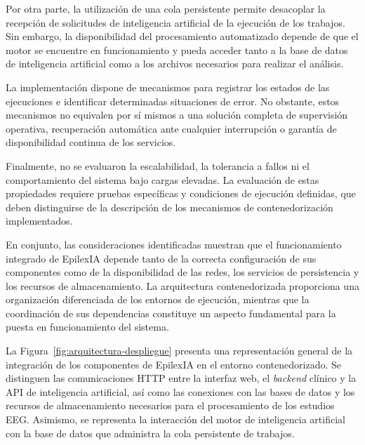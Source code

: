 Por otra parte, la utilización de una cola persistente
permite desacoplar la recepción de solicitudes de
inteligencia artificial de la ejecución de los trabajos.
Sin embargo, la disponibilidad del procesamiento
automatizado depende de que el motor se encuentre en
funcionamiento y pueda acceder tanto a la base de datos
de inteligencia artificial como a los archivos necesarios
para realizar el análisis.

La implementación dispone de mecanismos para registrar
los estados de las ejecuciones e identificar determinadas
situaciones de error. No obstante, estos mecanismos no
equivalen por sí mismos a una solución completa de
supervisión operativa, recuperación automática ante
cualquier interrupción o garantía de disponibilidad
continua de los servicios.

Finalmente, no se evaluaron la escalabilidad, la tolerancia
a fallos ni el comportamiento del sistema bajo cargas elevadas.
La evaluación de estas propiedades requiere pruebas
específicas y condiciones de ejecución definidas,
que deben distinguirse de la descripción de los
mecanismos de contenedorización implementados.

En conjunto, las consideraciones identificadas muestran
que el funcionamiento integrado de EpilexIA depende
tanto de la correcta configuración de sus componentes
como de la disponibilidad de las redes, los servicios
de persistencia y los recursos de almacenamiento.
La arquitectura contenedorizada proporciona una
organización diferenciada de los entornos de ejecución,
mientras que la coordinación de sus dependencias
constituye un aspecto fundamental para la puesta
en funcionamiento del sistema.

La Figura~\ref{fig:arquitectura-despliegue}
presenta una representación general de la integración
de los componentes de EpilexIA en el entorno
contenedorizado. Se distinguen las comunicaciones
HTTP entre la interfaz web, el \textit{backend} clínico y
la API de inteligencia artificial, así como las
conexiones con las bases de datos y los recursos
de almacenamiento necesarios para el procesamiento
de los estudios EEG. Asimismo, se representa
la interacción del motor de inteligencia artificial
con la base de datos que administra la cola
persistente de trabajos.


